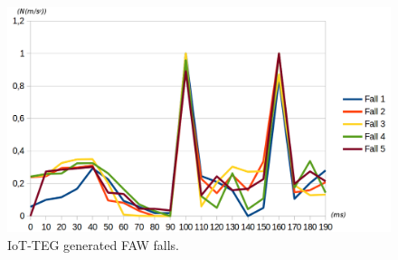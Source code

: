 \documentclass[review]{elsarticle}
\begin{document}
\begin{figure}[!ht]
	\centering
	\includegraphics[scale=0.26]{Images/IoTTEGFAWGeneratedEvents}
	\caption[IoT-TEG generated FAW falls]{IoT-TEG generated FAW falls.}
	\label{fig:IoTTEGFAWGeneratedEvents}
\end{figure}
\end{document}
